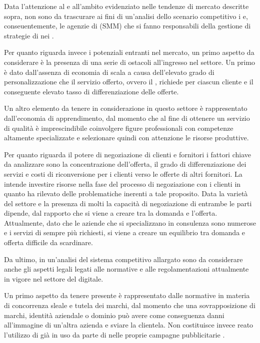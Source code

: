 Data l'attenzione al  e all'ambito  evidenziato nelle tendenze di mercato descritte sopra, non sono da trascurare ai fini di un'analisi dello scenario competitivo i  e, conseuentemente, le agenzie di  (SMM) che si fanno responsabili della gestione di strategie di \mktg nei .

Per quanto riguarda invece i potenziali entranti nel mercato, un primo aspetto da considerare è la presenza di una serie di ostacoli all'ingresso nel settore. Un primo è dato dall'assenza di economia di scala a causa dell'elevato grado di personalizzazione che il servizio offerto, ovvero il \mktg {}, richiede per ciascun cliente e il conseguente elevato tasso di differenziazione delle offerte.

Un altro elemento da tenere in considerazione in questo settore è rappresentato dall'economia di apprendimento, dal momento che al fine di ottenere un servizio di qualità è imprescindibile coinvolgere figure professionali con competenze altamente specializzate e selezionare quindi con attenzione le risorse produttive.

Per quanto riguarda il potere di negoziazione di clienti e  fornitori i fattori chiave da analizzare sono la concentrazione dell'offerta, il grado di differenziazione dei servizi e costi di riconversione per i clienti verso le offerte di altri fornitori.
La \customer intende investire risorse nella fase del processo di negoziazione con i clienti in quanto ha rilevato delle problematiche inerenti a tale proposito.
Data la varietà del settore e la presenza di molti  la capacità di negoziazione di entrambe le parti dipende, dal rapporto che si viene a creare tra la domanda e l'offerta. Attualmente, dato che le aziende che si specializzano in consulenza \mktg sono numerose e i servizi di \mktg sempre più richiesti, si viene a creare un equilibrio tra domanda e offerta difficile da scardinare. 

Da ultimo, in un'analisi del sistema competitivo allargato sono da considerare anche gli aspetti legali legati alle normative e alle regolamentazioni attualmente in vigore nel settore del \mktg digitale.

Un primo aspetto da tenere presente è rappresentato dalle normative in materia di concorrenza sleale e tutela dei marchi, dal momento che una sovrapposizione di marchi, identità aziendale o dominio  può avere come conseguenza danni all'immagine di un'altra azienda e sviare la clientela. Non costituisce invece reato l'utilizzo di  già in uso da parte di  nelle proprie campagne pubblicitarie .

